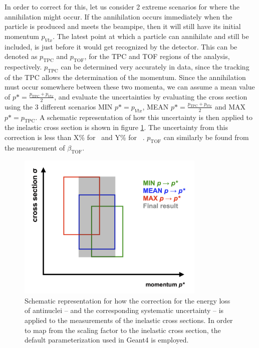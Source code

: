 In order to correct for this, let us consider 2 extreme scenarios for where the annihilation might occur. If the annihilation occurs immediately when the particle is produced and meets the beampipe, then it will still have its initial momentum $p_{Vtx}$. The latest point at which a particle can annihilate and still be included, is just before it would get recognized by the detector. This can be denoted as $p_{\mathrm{TPC}}$ and $p_{\mathrm{TOF}}$, for the TPC and TOF regions of the analysis, respectively. $p_{\mathrm{TPC}}$ can be determined very accurately in data, since the tracking of the TPC allows the determination of the momentum. Since the annihilation must occur somewhere between these two momenta, we can assume a mean value of $p* = \frac{p_{\mathrm{TPC}} + p_{Vtx}}{2}$, and evaluate the uncertainties by evaluating the cross section using the 3 different scenarios MIN $p*=p_{Vtx}$, MEAN $p* = \frac{p_{\mathrm{TPC}} + p_{Vtx}}{2}$ and MAX $p* = p_{\mathrm{TPC}}$. A schematic representation of how this uncertainty is then applied to the inelastic cross section is shown in figure \ref{fig:Eloss_schematic}. The uncertainty from this correction is less than X\% for \ahe\ and Y\% for \atrit\ . $p_{\mathrm{TOF}}$ can similarly be found from the measurement of $\beta_{\mathrm{TOF}}$. 

\begin{figure}
    \centering
    \includegraphics[width=0.8\textwidth]{figures/Eloss_corr_schematic.png}
    \caption{Schematic representation for how the correction for the energy loss of antinuclei -- and the corresponding systematic uncertainty -- is applied to the measurements of the inelastic cross sections. In order to map from the scaling factor to the inelastic cross section, the default parameterization used in Geant4 is employed.}
    \label{fig:Eloss_schematic}
\end{figure}






